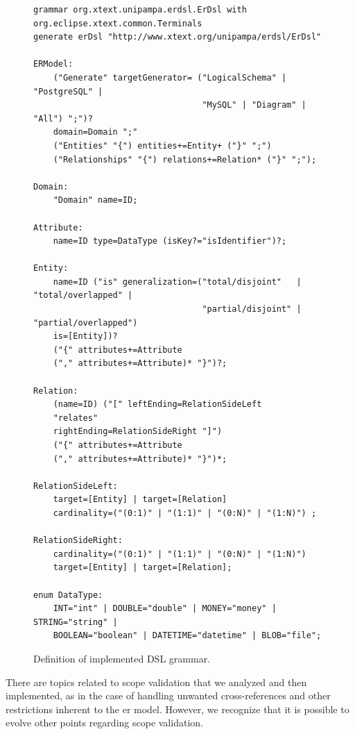 
\lstset{basicstyle=\tiny}
\begin{figure} [!htb]
    \centering
    \caption{Definition of implemented DSL grammar.}
    \label{fig:DSLvs1}
    \begin{scriptsize}
    \begin{lstlisting}[language = Xtext , frame = trbl]
grammar org.xtext.unipampa.erdsl.ErDsl with org.eclipse.xtext.common.Terminals
generate erDsl "http://www.xtext.org/unipampa/erdsl/ErDsl"

ERModel:
	("Generate" targetGenerator= ("LogicalSchema" | "PostgreSQL" | 
	                              "MySQL" | "Diagram" | "All") ";")?
	domain=Domain ";"
	("Entities" "{") entities+=Entity+ ("}" ";")
	("Relationships" "{") relations+=Relation* ("}" ";");

Domain:
	"Domain" name=ID;

Attribute:
	name=ID type=DataType (isKey?="isIdentifier")?;

Entity:
	name=ID ("is" generalization=("total/disjoint"   | "total/overlapped" |
	                              "partial/disjoint" | "partial/overlapped") 
	is=[Entity])?
	("{" attributes+=Attribute
	("," attributes+=Attribute)* "}")?;

Relation:
	(name=ID) ("[" leftEnding=RelationSideLeft
	"relates"
	rightEnding=RelationSideRight "]")
	("{" attributes+=Attribute
	("," attributes+=Attribute)* "}")*;

RelationSideLeft:
	target=[Entity] | target=[Relation]
	cardinality=("(0:1)" | "(1:1)" | "(0:N)" | "(1:N)") ;

RelationSideRight:
	cardinality=("(0:1)" | "(1:1)" | "(0:N)" | "(1:N)")
	target=[Entity] | target=[Relation];

enum DataType:
	INT="int" | DOUBLE="double" | MONEY="money" | STRING="string" |
	BOOLEAN="boolean" | DATETIME="datetime" | BLOB="file";
    \end{lstlisting}
    \end{scriptsize}    
\end{figure}

There are topics related to scope validation that we analyzed and then implemented, as in the case of handling unwanted cross-references and other restrictions inherent to the \ac{er} model.
However, we recognize that it is possible to evolve other points regarding scope validation.

